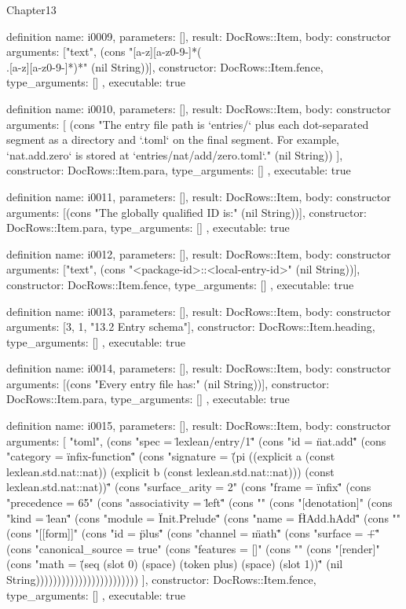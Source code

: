 \begin{lexlean}{Chapter13}
\begin{semanticmodule}
definition{
  name: i0009,
  parameters: [],
  result: DocRows::Item,
  body: constructor{
    arguments: ["text", (cons "[a-z][a-z0-9-]*(\\.[a-z][a-z0-9-]*)*" (nil String))],
    constructor: DocRows::Item.fence,
    type_arguments: []
  },
  executable: true
}

definition{
  name: i0010,
  parameters: [],
  result: DocRows::Item,
  body: constructor{
    arguments: [
      (cons "The entry file path is `entries/` plus each dot-separated segment as a directory and `.toml` on the final segment. For example, `nat.add.zero` is stored at `entries/nat/add/zero.toml`." (nil String))
    ],
    constructor: DocRows::Item.para,
    type_arguments: []
  },
  executable: true
}

definition{
  name: i0011,
  parameters: [],
  result: DocRows::Item,
  body: constructor{
    arguments: [(cons "The globally qualified ID is:" (nil String))],
    constructor: DocRows::Item.para,
    type_arguments: []
  },
  executable: true
}

definition{
  name: i0012,
  parameters: [],
  result: DocRows::Item,
  body: constructor{
    arguments: ["text", (cons "<package-id>::<local-entry-id>" (nil String))],
    constructor: DocRows::Item.fence,
    type_arguments: []
  },
  executable: true
}

definition{
  name: i0013,
  parameters: [],
  result: DocRows::Item,
  body: constructor{
    arguments: [3, 1, "13.2 Entry schema"],
    constructor: DocRows::Item.heading,
    type_arguments: []
  },
  executable: true
}

definition{
  name: i0014,
  parameters: [],
  result: DocRows::Item,
  body: constructor{
    arguments: [(cons "Every entry file has:" (nil String))],
    constructor: DocRows::Item.para,
    type_arguments: []
  },
  executable: true
}

definition{
  name: i0015,
  parameters: [],
  result: DocRows::Item,
  body: constructor{
    arguments: [
      "toml",
      (cons "spec = \"lexlean/entry/1\"" (cons "id = \"nat.add\"" (cons "category = \"infix-function\"" (cons "signature = \"(pi ((explicit a (const lexlean.std.nat::nat)) (explicit b (const lexlean.std.nat::nat))) (const lexlean.std.nat::nat))\"" (cons "surface_arity = 2" (cons "frame = \"infix\"" (cons "precedence = 65" (cons "associativity = \"left\"" (cons "" (cons "[denotation]" (cons "kind = \"lean\"" (cons "module = \"Init.Prelude\"" (cons "name = \"HAdd.hAdd\"" (cons "" (cons "[[form]]" (cons "id = \"plus\"" (cons "channel = \"math\"" (cons "surface = \"+\"" (cons "canonical_source = true" (cons "features = []" (cons "" (cons "[render]" (cons "math = \"(seq (slot 0) (space) (token plus) (space) (slot 1))\"" (nil String))))))))))))))))))))))))
    ],
    constructor: DocRows::Item.fence,
    type_arguments: []
  },
  executable: true
}


\end{semanticmodule}
\end{lexlean}
